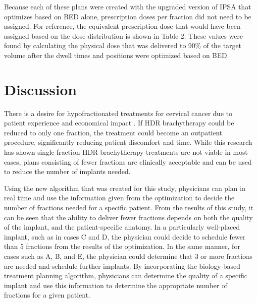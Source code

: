 \documentclass[osajnl,twocolumn,showpacs,superscriptaddress,10pt]{revtex4-1}
\begin{document}
Because each of these plans were created with the upgraded version of IPSA that optimizes based on BED alone, prescription doses per fraction did not need to be assigned. For reference, the equivalent prescription dose that would have been assigned based on the dose distribution is shown in Table 2. These values were found by calculating the physical dose that was delivered to 90$\%$ of the target volume after the dwell times and positions were optimized based on BED.

\section{Discussion}
There is a desire for hypofractionated treatments for cervical cancer due to patient experience and economical impact \cite{hypodesirable}. If HDR brachytherapy could be reduced to only one fraction, the treatment could become an outpatient procedure, significantly reducing patient discomfort and time. While this research has shown single fraction HDR brachytherapy treatments are not viable in most cases, plans consisting of fewer fractions are clinically acceptable and can be used to reduce the number of implants needed. 

Using the new algorithm that was created for this study, physicians can plan in real time and use the information given from the optimization to decide the number of fractions needed for a specific patient. From the results of this study, it can be seen that the ability to deliver fewer fractions depends on both the quality of the implant, and the patient-specific anatomy. In a particularly well-placed implant, such as in cases C and D, the physician could decide to schedule fewer than 5 fractions from the results of the optimization. In the same manner, for cases such as A, B, and E, the physician could determine that 3 or more fractions are needed and schedule further implants.  By incorporating the biology-based treatment planning algorithm, physicians can determine the quality of a specific implant and use this information to determine the appropriate number of fractions for a given patient.


\def\bibsection{\section*{\refname}} 



\end{document}
